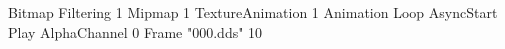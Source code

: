 {Bitmap
  {Filtering 1}
  {Mipmap 1}
  {TextureAnimation 1}
  {Animation Loop AsyncStart Play}
  {AlphaChannel 0}
  {Frame "000.dds" 10}
}
